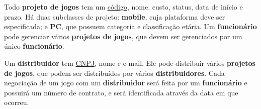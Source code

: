\documentclass[12pt, a4paper]{article}
\begin{document}
Todo \textbf{projeto de jogos} tem um \underline{código}, nome, custo, status, data de início e prazo. Há duas subclasses de projeto: \textbf{mobile}, cuja plataforma deve ser especificada; e \textbf{PC}, que possuem categoria e classificação etária. Um \textbf{funcionário} pode gerenciar vários \textbf{projetos de jogos}, que devem ser gerenciados por um único \textbf{funcionário}.

Um \textbf{distribuidor} tem \underline{CNPJ}, nome e e-mail. Ele pode distribuir vários \textbf{projetos de jogos}, que podem ser distribuídos por vários \textbf{distribuidores}. Cada negociação de um jogo com um \textbf{distribuidor} será feita por um \textbf{funcionário} e possuirá um número de contrato, e será identificada através da data em que ocorreu. 
\end{document}
